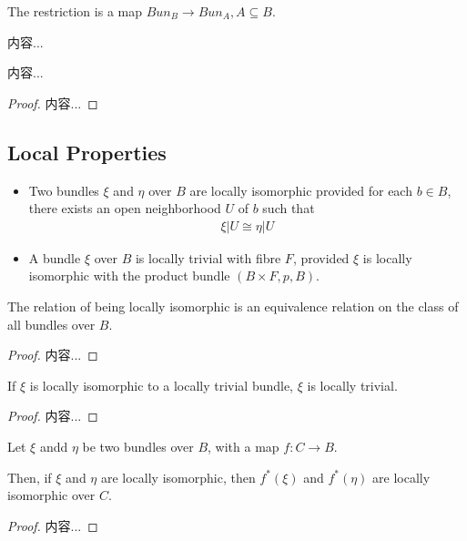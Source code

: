 \documentclass[Total.tex]{subfiles}
\begin{document}
		The restriction is a map $Bun_B\rightarrow Bun_A,A\subseteq B$. 
		
		\begin{Def}
			内容...
		\end{Def}
		
		\begin{proposition}
			内容...
		\end{proposition}
		\begin{proof}
			内容...
		\end{proof}
	\subsection{Local Properties}
		\begin{Def}
			\begin{itemize}
				\item 
				Two bundles $\xi$ and $\eta$ over $B$ are locally isomorphic provided for each $b\in B$, there exists an open neighborhood $U$ of $b$ such that
				\begin{gather*}
					\xi|U\cong \eta|U
				\end{gather*}
				\item A bundle $\xi$ over $B$ is locally trivial with fibre $F$, provided $\xi$ is locally isomorphic with the product bundle $(B\times F,p,B)$. 
			\end{itemize}
		\end{Def}
		
		\begin{proposition}
			The relation of being locally isomorphic is an equivalence relation on the class of all bundles over $B$.
		\end{proposition}
		\begin{proof}
			内容...
		\end{proof}
		
		\begin{corollary}
			If $\xi$ is locally isomorphic to a locally trivial bundle, $\xi$ is locally trivial. 
		\end{corollary}
		\begin{proof}
			内容...
		\end{proof}
		
		\begin{proposition}
			Let $\xi$ andd $\eta$ be two bundles over $B$, with a map $f:C\rightarrow B$.
			
			Then, if $\xi$ and $\eta$ are locally isomorphic, then $f^*(\xi)$ and $f^*(\eta)$ are locally isomorphic over $C$. 
		\end{proposition}
		\begin{proof}
			内容...
		\end{proof}
		
\end{document}
